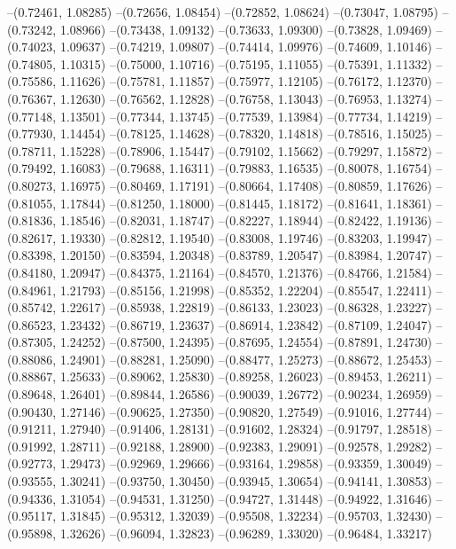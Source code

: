 --(0.72461, 1.08285)
--(0.72656, 1.08454)
--(0.72852, 1.08624)
--(0.73047, 1.08795)
--(0.73242, 1.08966)
--(0.73438, 1.09132)
--(0.73633, 1.09300)
--(0.73828, 1.09469)
--(0.74023, 1.09637)
--(0.74219, 1.09807)
--(0.74414, 1.09976)
--(0.74609, 1.10146)
--(0.74805, 1.10315)
--(0.75000, 1.10716)
--(0.75195, 1.11055)
--(0.75391, 1.11332)
--(0.75586, 1.11626)
--(0.75781, 1.11857)
--(0.75977, 1.12105)
--(0.76172, 1.12370)
--(0.76367, 1.12630)
--(0.76562, 1.12828)
--(0.76758, 1.13043)
--(0.76953, 1.13274)
--(0.77148, 1.13501)
--(0.77344, 1.13745)
--(0.77539, 1.13984)
--(0.77734, 1.14219)
--(0.77930, 1.14454)
--(0.78125, 1.14628)
--(0.78320, 1.14818)
--(0.78516, 1.15025)
--(0.78711, 1.15228)
--(0.78906, 1.15447)
--(0.79102, 1.15662)
--(0.79297, 1.15872)
--(0.79492, 1.16083)
--(0.79688, 1.16311)
--(0.79883, 1.16535)
--(0.80078, 1.16754)
--(0.80273, 1.16975)
--(0.80469, 1.17191)
--(0.80664, 1.17408)
--(0.80859, 1.17626)
--(0.81055, 1.17844)
--(0.81250, 1.18000)
--(0.81445, 1.18172)
--(0.81641, 1.18361)
--(0.81836, 1.18546)
--(0.82031, 1.18747)
--(0.82227, 1.18944)
--(0.82422, 1.19136)
--(0.82617, 1.19330)
--(0.82812, 1.19540)
--(0.83008, 1.19746)
--(0.83203, 1.19947)
--(0.83398, 1.20150)
--(0.83594, 1.20348)
--(0.83789, 1.20547)
--(0.83984, 1.20747)
--(0.84180, 1.20947)
--(0.84375, 1.21164)
--(0.84570, 1.21376)
--(0.84766, 1.21584)
--(0.84961, 1.21793)
--(0.85156, 1.21998)
--(0.85352, 1.22204)
--(0.85547, 1.22411)
--(0.85742, 1.22617)
--(0.85938, 1.22819)
--(0.86133, 1.23023)
--(0.86328, 1.23227)
--(0.86523, 1.23432)
--(0.86719, 1.23637)
--(0.86914, 1.23842)
--(0.87109, 1.24047)
--(0.87305, 1.24252)
--(0.87500, 1.24395)
--(0.87695, 1.24554)
--(0.87891, 1.24730)
--(0.88086, 1.24901)
--(0.88281, 1.25090)
--(0.88477, 1.25273)
--(0.88672, 1.25453)
--(0.88867, 1.25633)
--(0.89062, 1.25830)
--(0.89258, 1.26023)
--(0.89453, 1.26211)
--(0.89648, 1.26401)
--(0.89844, 1.26586)
--(0.90039, 1.26772)
--(0.90234, 1.26959)
--(0.90430, 1.27146)
--(0.90625, 1.27350)
--(0.90820, 1.27549)
--(0.91016, 1.27744)
--(0.91211, 1.27940)
--(0.91406, 1.28131)
--(0.91602, 1.28324)
--(0.91797, 1.28518)
--(0.91992, 1.28711)
--(0.92188, 1.28900)
--(0.92383, 1.29091)
--(0.92578, 1.29282)
--(0.92773, 1.29473)
--(0.92969, 1.29666)
--(0.93164, 1.29858)
--(0.93359, 1.30049)
--(0.93555, 1.30241)
--(0.93750, 1.30450)
--(0.93945, 1.30654)
--(0.94141, 1.30853)
--(0.94336, 1.31054)
--(0.94531, 1.31250)
--(0.94727, 1.31448)
--(0.94922, 1.31646)
--(0.95117, 1.31845)
--(0.95312, 1.32039)
--(0.95508, 1.32234)
--(0.95703, 1.32430)
--(0.95898, 1.32626)
--(0.96094, 1.32823)
--(0.96289, 1.33020)
--(0.96484, 1.33217)

